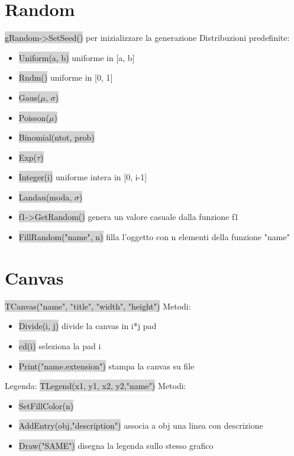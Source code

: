 \documentclass[a4paper]{article}
\begin{document}
\section{Random}
    \colorbox{LightGray}{gRandom->SetSeed()} per inizializzare la generazione
    Distribuzioni predefinite:
    \begin{itemize}
        \item \colorbox{LightGray}{Uniform(a, b)} uniforme in [a, b]
        \item \colorbox{LightGray}{Rndm()} uniforme in [0, 1]
        \item \colorbox{LightGray}{Gaus($\mu$, $\sigma$)}
        \item \colorbox{LightGray}{Poisson($\mu$)}
        \item \colorbox{LightGray}{Binomial(ntot, prob)}
        \item \colorbox{LightGray}{Exp($\tau$)}
        \item \colorbox{LightGray}{Integer(i)} uniforme intera in [0, i-1]
        \item \colorbox{LightGray}{Landau(moda, $\sigma$)}
        \item \colorbox{LightGray}{f1->GetRandom()} genera un valore casuale dalla funzione f1
        \item \colorbox{LightGray}{FillRandom("name", n)} filla l'oggetto con n elementi della funzione "name"
    \end{itemize}
\section{Canvas}
    \colorbox{LightGray}{TCanvas("name", "title", "width", "height")}
    Metodi:
    \begin{itemize}
        \item \colorbox{LightGray}{Divide(i, j)} divide la canvas in i*j pad
        \item \colorbox{LightGray}{cd(i)} seleziona la pad i
        \item \colorbox{LightGray}{Print("name.extension")} stampa la canvas su file
    \end{itemize}
    Legenda:
    \colorbox{LightGray}{TLegend(x1, y1, x2, y2,"name")}
    Metodi:
    \begin{itemize}
        \item \colorbox{LightGray}{SetFillColor(n)}
        \item \colorbox{LightGray}{AddEntry(obj,"description")} associa a obj una linea con descrizione
        \item \colorbox{LightGray}{Draw("SAME")} disegna la legenda sullo stesso grafico
    \end{itemize}
\end{document}
